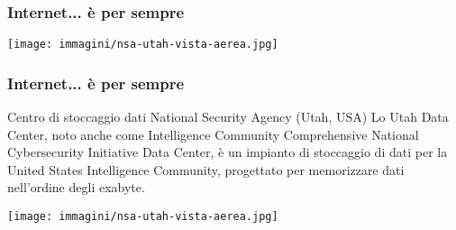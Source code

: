 \documentclass[italian,aspectratio=169]{beamer}
\begin{document}
{
\begin{frame}[plain]
\end{frame}
}

{
\begin{frame}[plain]
\end{frame}
}

{
\begin{frame}[plain]
\end{frame}
}

\begin{frame}
 \frametitle{Internet... è per sempre}
  \begin{center}
   \texttt{[image: immagini/nsa-utah-vista-aerea.jpg]}
 \end{center}
\end{frame}

\begin{frame}
 \frametitle{Internet... è per sempre}
 \begin{block}{Centro di stoccaggio dati National Security Agency (Utah, USA)}
  Lo Utah Data Center, noto anche come Intelligence Community Comprehensive
  National Cybersecurity Initiative Data Center, è un impianto di stoccaggio
  di dati per la United States Intelligence Community, progettato per
  memorizzare dati nell'ordine degli exabyte.
 \end{block}

  \begin{center}
   \texttt{[image: immagini/nsa-utah-vista-aerea.jpg]}
 \end{center}
\end{frame}
\end{document}
